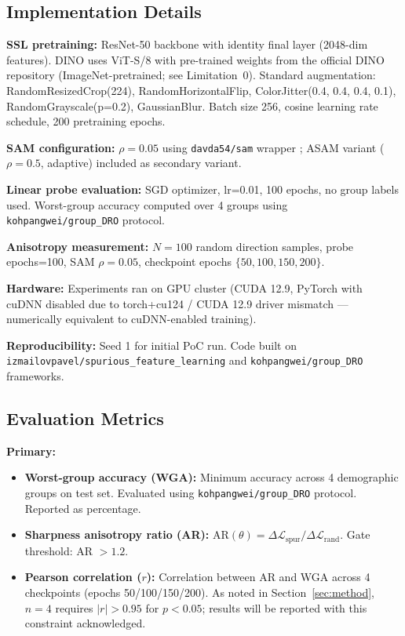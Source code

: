 \subsection{Implementation Details}

\textbf{SSL pretraining:} ResNet-50 backbone with identity final layer (2048-dim features). DINO uses ViT-S/8 with pre-trained weights from the official DINO repository (ImageNet-pretrained; see Limitation~0). Standard augmentation: RandomResizedCrop(224), RandomHorizontalFlip, ColorJitter(0.4, 0.4, 0.4, 0.1), RandomGrayscale(p=0.2), GaussianBlur. Batch size 256, cosine learning rate schedule, 200 pretraining epochs.

\textbf{SAM configuration:} $\rho=0.05$ using \texttt{davda54/sam} wrapper \citep{davda54sam2021}; ASAM variant ($\rho=0.5$, adaptive) included as secondary variant.

\textbf{Linear probe evaluation:} SGD optimizer, lr=0.01, 100 epochs, no group labels used. Worst-group accuracy computed over 4 groups using \texttt{kohpangwei/group\_DRO} protocol.

\textbf{Anisotropy measurement:} $N=100$ random direction samples, probe epochs=100, SAM $\rho=0.05$, checkpoint epochs $\{50, 100, 150, 200\}$.

\textbf{Hardware:} Experiments ran on GPU cluster (CUDA 12.9, PyTorch with cuDNN disabled due to torch+cu124 / CUDA 12.9 driver mismatch --- numerically equivalent to cuDNN-enabled training).

\textbf{Reproducibility:} Seed 1 for initial PoC run. Code built on \texttt{izmailovpavel/spurious\_feature\_learning} and \texttt{kohpangwei/group\_DRO} frameworks.

\subsection{Evaluation Metrics}

\textbf{Primary:}
\begin{itemize}
    \item \textbf{Worst-group accuracy (WGA):} Minimum accuracy across 4 demographic groups on test set. Evaluated using \texttt{kohpangwei/group\_DRO} protocol. Reported as percentage.
    \item \textbf{Sharpness anisotropy ratio (AR):} $\text{AR}(\theta) = \Delta\mathcal{L}_{\text{spur}} / \Delta\mathcal{L}_{\text{rand}}$. Gate threshold: AR $> 1.2$.
    \item \textbf{Pearson correlation ($r$):} Correlation between AR and WGA across 4 checkpoints (epochs 50/100/150/200). As noted in Section~\ref{sec:method}, $n=4$ requires $|r|>0.95$ for $p<0.05$; results will be reported with this constraint acknowledged.
\end{itemize}

